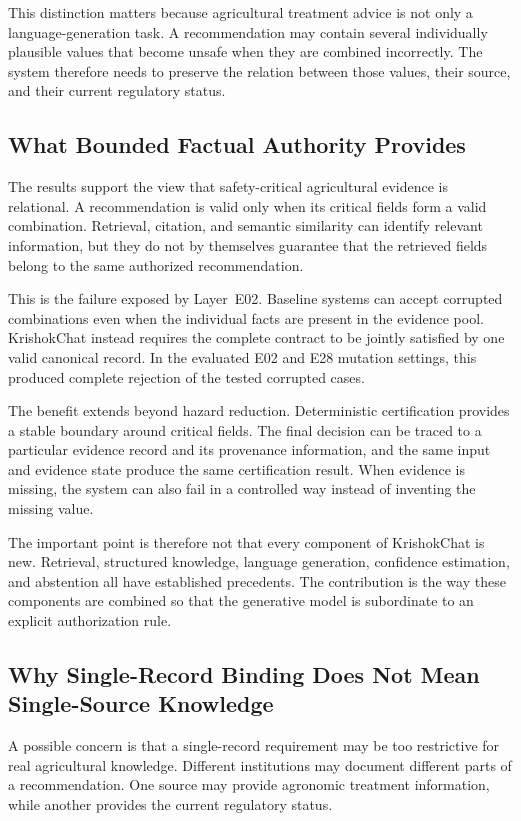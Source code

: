 \documentclass[a4paper,fleqn]{cas-dc}
\begin{document}
This distinction matters because agricultural treatment advice is not only a language-generation task. A recommendation may contain several individually plausible values that become unsafe when they are combined incorrectly. The system therefore needs to preserve the relation between those values, their source, and their current regulatory status.

\subsection{What Bounded Factual Authority Provides}

The results support the view that safety-critical agricultural evidence is relational. A recommendation is valid only when its critical fields form a valid combination. Retrieval, citation, and semantic similarity can identify relevant information, but they do not by themselves guarantee that the retrieved fields belong to the same authorized recommendation.

This is the failure exposed by Layer~E02. Baseline systems can accept corrupted combinations even when the individual facts are present in the evidence pool. KrishokChat instead requires the complete contract to be jointly satisfied by one valid canonical record. In the evaluated E02 and E28 mutation settings, this produced complete rejection of the tested corrupted cases.  

The benefit extends beyond hazard reduction. Deterministic certification provides a stable boundary around critical fields. The final decision can be traced to a particular evidence record and its provenance information, and the same input and evidence state produce the same certification result. When evidence is missing, the system can also fail in a controlled way instead of inventing the missing value.

The important point is therefore not that every component of KrishokChat is new. Retrieval, structured knowledge, language generation, confidence estimation, and abstention all have established precedents. The contribution is the way these components are combined so that the generative model is subordinate to an explicit authorization rule.

\subsection{Why Single-Record Binding Does Not Mean Single-Source Knowledge}

A possible concern is that a single-record requirement may be too restrictive for real agricultural knowledge. Different institutions may document different parts of a recommendation. One source may provide agronomic treatment information, while another provides the current regulatory status.
\end{document}
